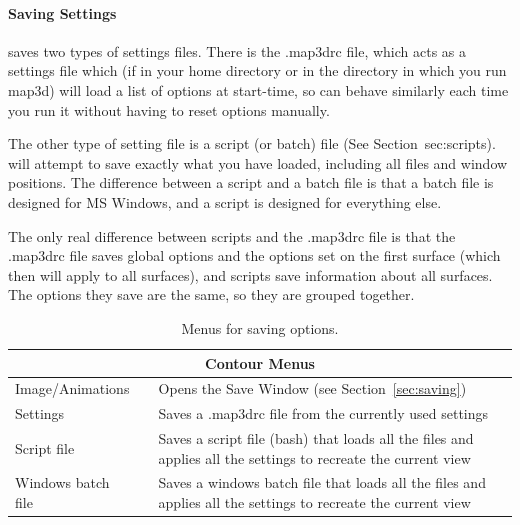 \paragraph{Saving Settings}
\label{sec:savesettings}

\map{} saves two types of settings files.  There is the .map3drc file,
which acts as a settings file which (if in your home directory or in the
directory in which you run map3d) will load a list of options at
start-time, so \map{} can behave similarly each time you run it without
having to reset options manually.

The other type of setting file is a script (or batch) file (See
Section~sec:scripts).  \map{} will attempt to save exactly what you have
loaded, including all files and window positions.  The difference between a
script and a batch file is that a batch file is designed for MS Windows,
and a script is designed for everything else.

The only real difference between scripts and the .map3drc file is that the
.map3drc file saves global options and the options set on the first surface
(which then will apply to all surfaces), and scripts save information about
all surfaces.  The options they save are the same, so they are grouped
together.

\begin{table}[ht]
\caption{\label{table:saving}Menus for saving options.}
  \begin{center}
    \begin{tabular}{|l|l|p{3 in}|} \hline
      \multicolumn{3}{|c|}{\textbf{Contour Menus}} \\ \hline
    Image/Animations & &  Opens the Save Window (see Section~\ref{sec:saving})  \\
    Settings & & Saves a .map3drc file from the currently used settings \\
    Script file & & Saves a script file (bash) that loads all the files and
        applies all the settings to recreate the current view \\
    Windows batch file & & Saves a windows batch file that loads all the files
        and applies all the settings to recreate the current view \\ \hline
    \end{tabular}
  \end{center}
\end{table}

